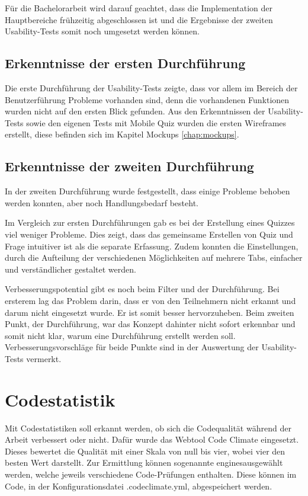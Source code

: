 Für die Bachelorarbeit wird darauf geachtet, dass die Implementation der Hauptbereiche frühzeitig abgeschlossen ist und die Ergebnisse der zweiten Usability-Tests somit noch umgesetzt werden können. 


\subsection{Erkenntnisse der ersten Durchführung}
Die erste Durchführung der \gls{Usability-Test}s zeigte, dass vor allem im Bereich der Benutzerführung Probleme vorhanden sind, denn die vorhandenen Funktionen wurden nicht auf den ersten Blick gefunden.
Aus den Erkenntnissen der Usability-Tests sowie den eigenen Tests mit Mobile Quiz wurden die ersten \gls{Wireframes} erstellt, diese befinden sich im Kapitel Mockups \ref{chap:mockups}.

\subsection{Erkenntnisse der zweiten Durchführung}
In der zweiten Durchführung wurde festgestellt, dass einige Probleme behoben werden konnten, aber noch Handlungsbedarf besteht.

Im Vergleich zur ersten Durchführungen gab es bei der Erstellung eines Quizzes viel weniger Probleme. Dies zeigt, dass das gemeinsame Erstellen von Quiz und Frage intuitiver ist als die separate Erfassung. Zudem konnten die Einstellungen, durch die Aufteilung der verschiedenen Möglichkeiten auf mehrere Tabs, einfacher und verständlicher gestaltet werden.

Verbesserungspotential gibt es noch beim Filter und der Durchführung. Bei ersterem lag das Problem darin, dass er von den Teilnehmern nicht erkannt und darum nicht eingesetzt wurde. Er ist somit besser hervorzuheben. Beim zweiten Punkt, der Durchführung, war das Konzept dahinter nicht sofort erkennbar und somit nicht klar, warum eine Durchführung erstellt werden soll. Verbesserungsvorschläge für beide Punkte sind in der Auswertung der Usability-Tests vermerkt.





\newpage
\section{Codestatistik}
Mit Codestatistiken soll erkannt werden, ob sich die Codequalität während der Arbeit verbessert oder nicht. Dafür wurde das Webtool Code Climate \cite{codeclimate.com} eingesetzt. Dieses bewertet die Qualität mit einer Skala von null bis vier, wobei vier den besten Wert darstellt. Zur Ermittlung können sogenannte \glqq engines\grqq ausgewählt werden, welche jeweils verschiedene Code-Prüfungen enthalten. Diese können im Code, in der Konfigurationsdatei \glqq .codeclimate.yml\grqq, abgespeichert werden.\\

